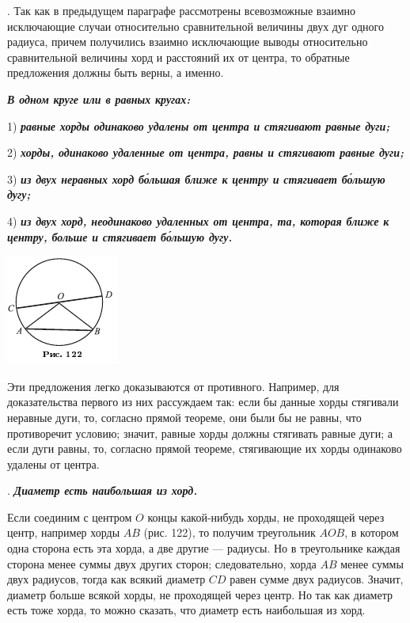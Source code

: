 \documentclass[oneside]{book}
\begin{document}
.
Так как в предыдущем параграфе рассмотрены всевозможные взаимно исключающие случаи относительно сравнительной величины двух дуг одного радиуса, причем получились взаимно исключающие выводы относительно сравнительной величины хорд и расстояний их от центра, то обратные предложения должны быть верны, а именно.

\textbf{\emph{В одном круге или в равных кругах:}}

1) \textbf{\emph{равные хорды одинаково удалены от центра и стягивают равные дуги;}}

2) \textbf{\emph{хорды, одинаково удаленные от центра, равны и стягивают равные дуги;}}

3) \textbf{\emph{из двух неравных хорд б\'{о}льшая ближе к центру и стягивает б\'{о}льшую дугу;}}

4) \textbf{\emph{из двух хорд, неодинаково удаленных от центра, та, которая ближе к центру, больше и стягивает б\'{о}льшую дугу.}}

\includegraphics{pics/ris-122}

Эти предложения легко доказываются от противного.
Например, для доказательства первого из них рассуждаем так:
если бы данные хорды стягивали неравные дуги, то, согласно прямой теореме, они были бы не равны, что противоречит условию;
значит, равные хорды должны стягивать равные дуги;
а если дуги равны, то, согласно прямой теореме, стягивающие их хорды одинаково удалены от центра.

.
\textbf{\emph{Диаметр есть наибольшая из хорд.}}

Если соединим с центром $O$ концы какой-нибудь хорды, не проходящей через центр, например хорды $AB$ (рис. 122), то получим треугольник $AOB$, в котором одна сторона есть эта хорда, а две другие — радиусы.
Но в треугольнике каждая сторона менее суммы двух других сторон;
следовательно, хорда $AB$ менее суммы двух радиусов, тогда как всякий диаметр $CD$ равен сумме двух радиусов.
Значит, диаметр больше всякой хорды, не проходящей через центр.
Но так как диаметр есть тоже хорда, то можно сказать, что диаметр есть наибольшая из хорд.
\end{document}

